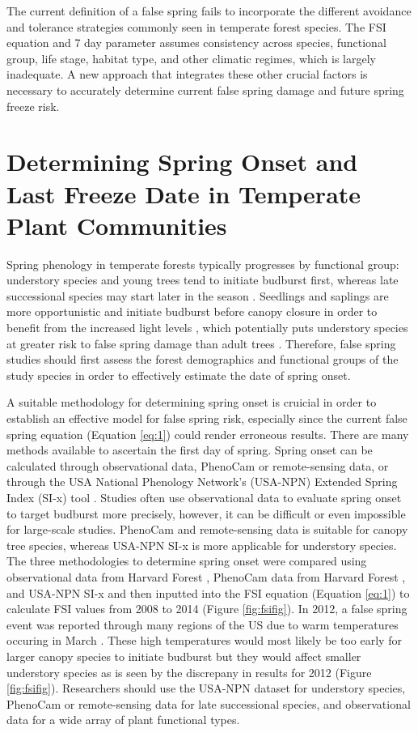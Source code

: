 \documentclass{article}\usepackage[]{graphicx}\usepackage[]{color}
\begin{document}
The current definition of a false spring fails to incorporate the different avoidance and tolerance strategies commonly seen in temperate forest species. The FSI equation and 7 day parameter assumes consistency across species, functional group, life stage, habitat type, and other climatic regimes, which is largely inadequate. A new approach that integrates these other crucial factors is necessary to accurately determine current false spring damage and future spring freeze risk.

\section*{Determining Spring Onset and Last Freeze Date in Temperate Plant Communities}
Spring phenology in temperate forests typically progresses by functional group: understory species and young trees tend to initiate budburst first, whereas late successional species may start later in the season \citep{Richardson2009, Xin2016}. Seedlings and saplings are more opportunistic and initiate budburst before canopy closure in order to benefit from the increased light levels \citep{Augspurger2008}, which potentially puts understory species at greater risk to false spring damage than adult trees \citep{Vitasse2014}. Therefore, false spring studies should first assess the forest demographics and functional groups of the study species in order to effectively estimate the date of spring onset.

A suitable methodology for determining spring onset is cruicial in order to establish an effective model for false spring risk, especially since the current false spring equation (Equation \ref{eq:1}) could render erroneous results. There are many methods available to ascertain the first day of spring. Spring onset can be calculated through observational data, PhenoCam or remote-sensing data, or through the USA National Phenology Network's (USA-NPN) Extended Spring Index (SI-x) tool \citep{USA-NPN2016}. Studies often use observational data to evaluate spring onset to target budburst more precisely, however, it can be difficult or even impossible for large-scale studies. PhenoCam and remote-sensing data is suitable for canopy tree species, whereas USA-NPN SI-x is more applicable for understory species. The three methodologies to determine spring onset were compared using observational data from Harvard Forest \citep{Okeefe2014}, PhenoCam data from Harvard Forest \citep{Richardson2015}, and USA-NPN SI-x \citep{USA-NPN2016} and then inputted into the FSI equation (Equation \ref{eq:1}) to calculate FSI values from 2008 to 2014 (Figure \ref{fig:fsifig}). In 2012, a false spring event was reported through many regions of the US due to warm temperatures occuring in March \citep{Ault2015}. These high temperatures would most likely be too early for larger canopy species to initiate budburst but they would affect smaller understory species as is seen by the discrepany in results for 2012 (Figure \ref{fig:fsifig}). Researchers should use the USA-NPN dataset for understory species, PhenoCam or remote-sensing data for late successional species, and observational data for a wide array of plant functional types.
\end{document}
